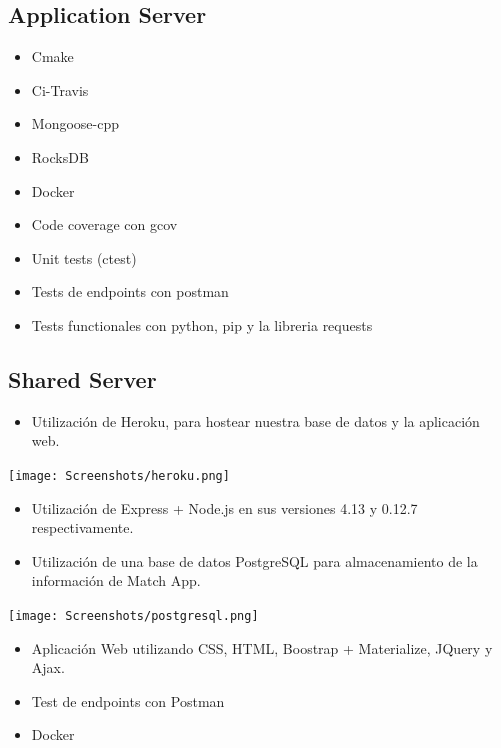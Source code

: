 \documentclass[letterpaper,10pt,english]{sphinxmanual}
\begin{document}
\subsection{Application Server}
\label{manuals:application-server}\begin{itemize}
\item {} 
Cmake

\item {} 
Ci-Travis

\item {} 
Mongoose-cpp

\item {} 
RocksDB

\item {} 
Docker

\item {} 
Code coverage con gcov

\item {} 
Unit tests (ctest)

\item {} 
Tests de endpoints con postman

\item {} 
Tests functionales con python, pip y la libreria requests

\end{itemize}


\subsection{Shared Server}
\label{manuals:shared-server}\begin{itemize}
\item {} 
Utilización de Heroku, para hostear nuestra base de datos y la aplicación web.

\end{itemize}

\texttt{[image: Screenshots/heroku.png]}
\begin{itemize}
\item {} 
Utilización de Express + Node.js en sus versiones 4.13 y 0.12.7 respectivamente.

\item {} 
Utilización de una base de datos PostgreSQL para almacenamiento de la información de Match App.

\end{itemize}

\texttt{[image: Screenshots/postgresql.png]}
\begin{itemize}
\item {} 
Aplicación Web utilizando CSS, HTML, Boostrap + Materialize, JQuery y Ajax.

\item {} 
Test  de endpoints con Postman

\item {} 
Docker

\end{itemize}
\end{document}

